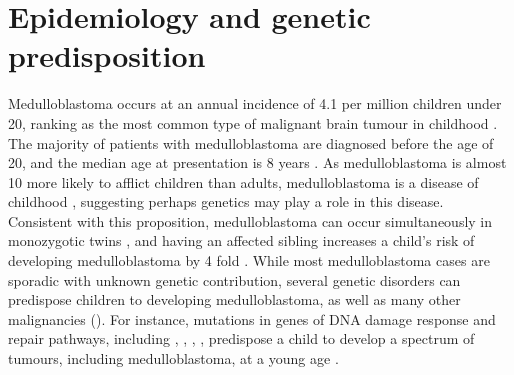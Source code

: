\section{Epidemiology and genetic predisposition}

Medulloblastoma occurs at an annual incidence of 4.1 per million children under 20, ranking as the most common type of malignant brain tumour in childhood . The majority of patients with medulloblastoma are diagnosed before the age of 20, and the median age at presentation is 8 years . As medulloblastoma is almost 10 more likely to afflict children than adults, medulloblastoma is a disease of childhood , suggesting perhaps genetics may play a role in this disease. Consistent with this proposition, medulloblastoma can occur simultaneously in monozygotic twins , and having an affected sibling increases a child's risk of developing medulloblastoma by 4 fold . While most medulloblastoma cases are sporadic with unknown genetic contribution, several genetic disorders can predispose children to developing medulloblastoma, as well as many other malignancies (). For instance, mutations in genes of DNA damage response and repair pathways, including , , , , predispose a child to develop a spectrum of tumours, including medulloblastoma, at a young age .


